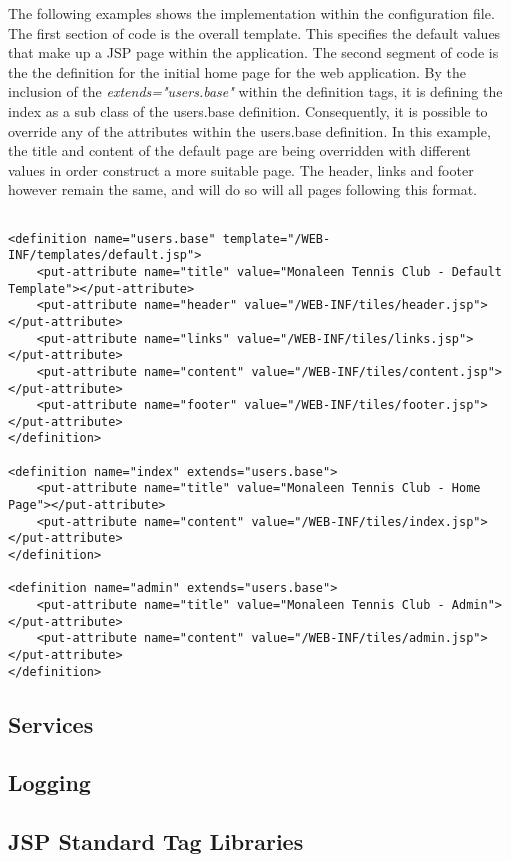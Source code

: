 The following examples shows the implementation within the configuration file. The first section of code is the overall template. This specifies the default values that make up a JSP page within the application. The second segment of code is the the definition for the initial home page for the web application. By the inclusion of the \textit{extends="users.base"} within the definition tags, it is defining the index as a sub class of the users.base definition. Consequently, it is possible to override any of the attributes within the users.base definition. In this example, the title and content of the default page are being overridden with different values in order construct a more suitable page. The header, links and footer however remain the same, and will do so will all pages following this format.

\begin{lstlisting}

<definition name="users.base" template="/WEB-INF/templates/default.jsp">
	<put-attribute name="title" value="Monaleen Tennis Club - Default Template"></put-attribute>
	<put-attribute name="header" value="/WEB-INF/tiles/header.jsp"></put-attribute>
	<put-attribute name="links" value="/WEB-INF/tiles/links.jsp"></put-attribute>
	<put-attribute name="content" value="/WEB-INF/tiles/content.jsp"></put-attribute>
	<put-attribute name="footer" value="/WEB-INF/tiles/footer.jsp"></put-attribute>
</definition>

<definition name="index" extends="users.base">
	<put-attribute name="title" value="Monaleen Tennis Club - Home Page"></put-attribute>
	<put-attribute name="content" value="/WEB-INF/tiles/index.jsp"></put-attribute>
</definition>

<definition name="admin" extends="users.base">
	<put-attribute name="title" value="Monaleen Tennis Club - Admin"></put-attribute>
	<put-attribute name="content" value="/WEB-INF/tiles/admin.jsp"></put-attribute>
</definition>

\end{lstlisting}

\subsection{Services}

\subsection{Logging}

\subsection{JSP Standard Tag Libraries}

